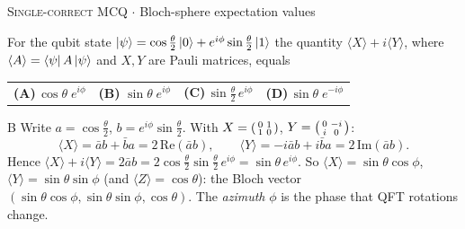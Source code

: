 \documentclass[11pt,a4paper]{article}
\newcommand{\optlabel}[1]{\textbf{(#1)}}
\newcommand{\correctlabel}[1]{\textcolor{okgreen}{\textbf{(#1)}\,\ding{51}}}
\newenvironment{qitem}[1]{\begin{list}{}{\setlength{\leftmargin}{3.3em}\setlength{\labelwidth}{3.1em}%
  \setlength{\labelsep}{0.2em}\setlength{\topsep}{3pt}\setlength{\parsep}{3pt}}\item[\textbf{Q.#1}\hfill]}{\end{list}}
\newcommand{\qsep}{\par\vspace{2pt}{\color{black!15}\hrule}\vspace{4pt}}
\newcommand{\qmeta}[2]{{\footnotesize\color{black!60}\textsc{#1} \;$\cdot$\; #2}\par}
\begin{document}
\begin{qitem}{24}
\qmeta{Single-correct MCQ}{Bloch-sphere expectation values}
For the qubit state $\ket{\psi} = \cos\frac{\theta}{2}\ket{0} + e^{i\phi}\sin\frac{\theta}{2}\ket{1}$ the quantity
$\langle X\rangle + i\langle Y\rangle$, where $\langle A\rangle = \bra{\psi}A\ket{\psi}$ and $X, Y$ are Pauli matrices, equals
\par\smallskip\noindent\begin{tabularx}{\linewidth}{@{}*{4}{L}@{}}
\optlabel{A}\,$\cos\theta\; e^{i\phi}$ & \correctlabel{B}\,$\sin\theta\; e^{i\phi}$ & \optlabel{C}\,$\sin\frac{\theta}{2}\, e^{i\phi}$ & \optlabel{D}\,$\sin\theta\; e^{-i\phi}$
\end{tabularx}
\end{qitem}
\begin{solbox}{B}
Write $a = \cos\frac\theta2$, $b = e^{i\phi}\sin\frac\theta2$. With $X = \begin{psmallmatrix}0&1\\1&0\end{psmallmatrix}$,
$Y = \begin{psmallmatrix}0&-i\\i&0\end{psmallmatrix}$:
\[ \langle X\rangle = \bar a b + \bar b a = 2\,\mathrm{Re}(\bar a b), \qquad \langle Y\rangle = -i\bar a b + i\bar b a = 2\,\mathrm{Im}(\bar a b). \]
Hence $\langle X\rangle + i\langle Y\rangle = 2\bar a b = 2\cos\frac\theta2\sin\frac\theta2\,e^{i\phi} = \sin\theta\,e^{i\phi}$.
So $\langle X\rangle = \sin\theta\cos\phi$, $\langle Y\rangle = \sin\theta\sin\phi$ (and $\langle Z\rangle = \cos\theta$): the Bloch vector
$(\sin\theta\cos\phi, \sin\theta\sin\phi, \cos\theta)$. The \emph{azimuth} $\phi$ is the phase that QFT rotations change.
\end{solbox}
\qsep
\end{document}
